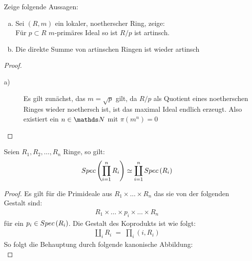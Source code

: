 \documentclass[ngerman, parskip=half, titlepage=false]{scrartcl}
\begin{document}
\begin{Satz}
  Zeige folgende Aussagen:
  \begin{enumerate}[a)]
  \item  Sei $(R,m)$ ein lokaler, noetherscher Ring, zeige: \\
    Für $p \subset R$ $m$-primäres Ideal so ist $R/p$ ist artinsch.
  \item Die direkte Summe von artinschen Ringen ist wieder artinsch
  \end{enumerate}
  \begin{proof}
    \begin{description}
    \item[a)] Es gilt zunächst, das $m = \sqrt{p}$ gilt, da $R/p$ als Quotient eines
      noetherschen Ringes wieder noethersch ist, ist das maximal Ideal endlich  
      erzeugt. Also existiert ein $n \in \N$ mit $\pi(m^n) = 0$
    \end{description}
  \end{proof}
\end{Satz}

\begin{Satz}
  Seien $R_1,R_2,\ldots,R_n$ Ringe, so gilt:
  \begin{gather*}
    Spec \left( \prod\limits_{i = 1}^n R_i \right) \simeq \coprod\limits_{i=1}^n Spec \left( R_i \right)
  \end{gather*}
  \begin{proof}
    Es gilt für die Primideale aus $R_1 \times \ldots \times R_n$ das sie von 
    der folgenden Gestalt sind:
    \begin{gather*}
      R_1 \times \ldots \times p_i \times \ldots \times  R_n
    \end{gather*}
    für ein $p_i \in Spec \left( R_i \right)$. Die Gestalt des Koprodukts ist wie folgt:
    \begin{gather*}
      \coprod\limits_{i} R_i \; = \;  \prod\limits_i (i,R_i)
    \end{gather*}
    So folgt die Behauptung durch folgende kanonische Abbildung:\\
\end{proof}
\end{Satz}
\end{document}
